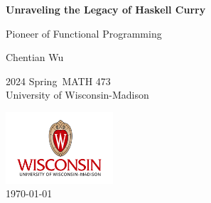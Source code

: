 
\begin{titlepage}
    \begin{center}
        \vspace*{2.7cm}
            
        \Huge
        \textbf{Unraveling the Legacy of Haskell Curry}
            
        \vspace{1cm}
        \huge
        Pioneer of Functional Programming
        \vspace{1.5cm}
        \Large
            
        Chentian Wu\vfill

        2024 Spring\ MATH 473\\
        University of Wisconsin-Madison\\
        \vspace{1cm}  
    
        \includegraphics[width=0.3\textwidth]{templates/logo-wisc.png}\\
        \vspace{1cm}  
        \Large \today
        
    \end{center}
\end{titlepage}
